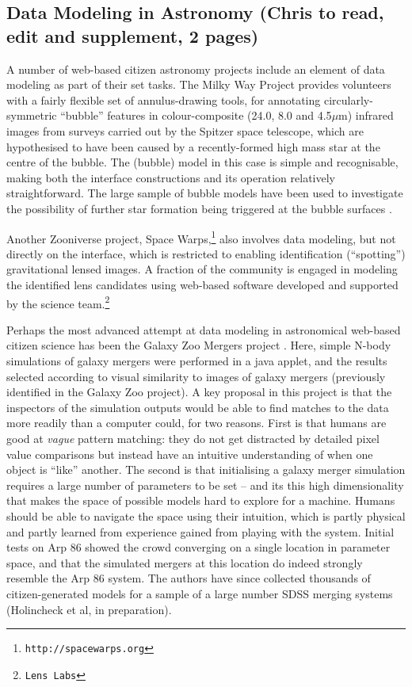 \documentclass{ar2e}
\begin{document}

\subsection{Data Modeling in Astronomy (Chris to read, edit and supplement, 2 pages)}
\label{sec:model:astro}

A number of  web-based citizen astronomy projects include an element of data
modeling as part of their set tasks. The Milky Way Project
\citep{SimpsonEtal2012} provides volunteers with a fairly flexible set of
annulus-drawing tools, for annotating circularly-symmetric ``bubble'' features
in colour-composite (24.0, 8.0 and  4.5$\mu$m) infrared images from surveys
carried out by the Spitzer space telescope, which are hypothesised to have
been caused by a recently-formed high mass star at the centre of the bubble.
The (bubble) model in this case is simple and recognisable, making both the
interface constructions and its operation relatively straightforward. The
large sample of  bubble models have been used to investigate the possibility
of further star formation being triggered at the bubble surfaces
\citep{KendrewEtal2012}.

Another Zooniverse project, Space
Warps,\footnote{\texttt{http://spacewarps.org}} also involves data modeling,
but not directly on the interface, which is restricted to enabling
identification (``spotting'') gravitational lensed images. A fraction of the
community is engaged in modeling the  identified lens candidates using
web-based software developed and supported  by the science
team.\footnote{\texttt{Lens Labs}} 

Perhaps the most advanced attempt at data modeling in astronomical web-based
citizen science has been the Galaxy Zoo Mergers project
\citep{HolincheckEtal2010,WallinEtal2010}. Here, simple N-body simulations of
galaxy mergers were performed in a java applet, and the results selected
according to visual similarity to images of galaxy mergers (previously
identified in the Galaxy Zoo project). A key proposal in this project is that
the inspectors of the simulation outputs would be able to find matches to the
data more readily than a computer could, for two reasons. First is that humans
are good at {\it vague} pattern matching: they do not get distracted by
detailed pixel value comparisons but instead have an intuitive understanding
of when one object is ``like'' another. The second is that initialising a
galaxy merger simulation requires a large number of parameters to be set --
and its this high dimensionality  that makes the space of possible models hard
to explore for a machine. Humans should be able to navigate the space using
their intuition, which is partly physical and partly learned from experience
gained from playing with the system. Initial tests on Arp 86  showed the crowd
converging on a single location in parameter space, and that the simulated
mergers at this location do indeed strongly resemble the Arp 86 system. The
authors have since collected thousands of citizen-generated models for a
sample of a large number SDSS merging systems (Holincheck et al, in
preparation). 
\end{document}
